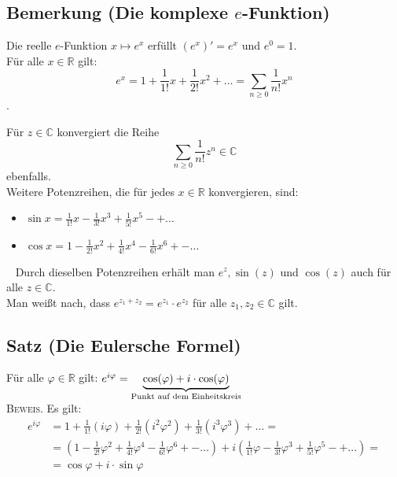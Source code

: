 \subsection[Die komplexe $e$-Funktion]{Bemerkung (Die komplexe $e$-Funktion)}

	Die reelle $e$-Funktion $x\mapsto e^x$ erfüllt $(e^x)'=e^x$ und $e^0=1$.\\
	Für alle $x\in\mathbb{R}$ gilt: \[
	e^x=1+\frac{1}{1!}x+\frac{1}{2!}x^2+\dots =\sum_{n\geq 0} \frac{1}{n!}x^n \].\\ \newline
	
	Für $z\in\mathbb{C}$ konvergiert die Reihe \[\sum_{n\geq 0} \frac{1}{n!}z^n \in\mathbb{C} \] ebenfalls.\\
	\newline
	Weitere Potenzreihen, die für jedes $x\in\mathbb{R}$ konvergieren, sind:
	
	\begin{itemize}
	\item $\sin x=\frac{1}{1!}x-\frac{1}{3!}x^3+\frac{1}{5!}x^5-+\dots$
	\item $\cos x=1-\frac{1}{2!}x^2+\frac{1}{4!}x^4-\frac{1}{6!}x^6+-\dots$
	\end{itemize}

	~\newline
	Durch dieselben Potenzreihen erhält man $e^z,\sin(z)$ und $\cos(z)$ auch für alle $z\in\mathbb{C}$.\\ \newline
	Man weißt nach, dass $e^{z_1+z_2}=e^{z_1}\cdot e^{z_2}$ für alle $z_1,z_2 \in\mathbb{C}$ gilt.\\ \newline 
	
	
\subsection[Die Eulersche Formel]{Satz (Die Eulersche Formel)}

	Für alle $\varphi\in\mathbb{R}$ gilt: 
	$e^{i\varphi}=\underbrace{\cos(\varphi)+i\cdot\cos(\varphi)}_{\textnormal{Punkt auf dem Einheitskreis}}$\\
	\newline
	\textsc{Beweis.} Es gilt:
	\begin{align*}
	e^{i\varphi} 	&=1+\frac{1}{1!}(i\varphi)+\frac{1}{2!}(i^2\varphi^2)+\frac{1}{3!}(i^3\varphi^3)+\dots=\\
					&=(1-\frac{1}{2!}\varphi^2+\frac{1}{4!}\varphi^4-\frac{1}{6!}\varphi^6+-\dots)+
					i(\frac{1}{1!}\varphi-\frac{1}{3!}\varphi^3+\frac{1}{5!}\varphi^5-+\dots)=\\
					&=\cos\varphi+i\cdot\sin\varphi 
	\end{align*}
	
